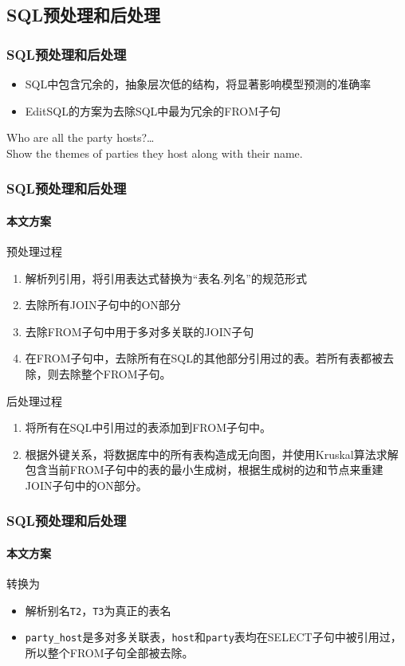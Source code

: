 \documentclass{ctexbeamer}
\begin{document}
\subsection{SQL预处理和后处理}
\begin{frame}
  \frametitle{SQL预处理和后处理}
  \begin{itemize}
    \item SQL中包含冗余的，抽象层次低的结构，将显著影响模型预测的准确率
    \item EditSQL的方案为去除SQL中最为冗余的FROM子句
  \end{itemize}
  \begin{example}
    Who are all the party hosts?…\\
    Show the themes of parties they host along with their name.

    \vspace{0.2cm}
    
  \end{example}
\end{frame}
\begin{frame}
  \frametitle{SQL预处理和后处理}
  \framesubtitle{本文方案}
  预处理过程
  \begin{enumerate}
    \item 解析列引用，将引用表达式替换为“表名.列名”的规范形式
    \item 去除所有JOIN子句中的ON部分
    \item 去除FROM子句中用于多对多关联的JOIN子句
    \item 在FROM子句中，去除所有在SQL的其他部分引用过的表。若所有表都被去除，则去除整个FROM子句。
  \end{enumerate}
  后处理过程
  \begin{enumerate}
    \item 将所有在SQL中引用过的表添加到FROM子句中。
    \item 根据外键关系，将数据库中的所有表构造成无向图，并使用Kruskal算法求解包含当前FROM子句中的表的最小生成树，根据生成树的边和节点来重建JOIN子句中的ON部分。
  \end{enumerate}
\end{frame}
\begin{frame}
  \frametitle{SQL预处理和后处理}
  \framesubtitle{本文方案}
  \begin{example}
    

    转换为

    
  \end{example}
  \begin{itemize}
    \item 解析别名\texttt{T2}，\texttt{T3}为真正的表名
    \item \texttt{party\_host}是多对多关联表，\texttt{host}和\texttt{party}表均在SELECT子句中被引用过，所以整个FROM子句全部被去除。
  \end{itemize}
\end{frame}
\end{document}
